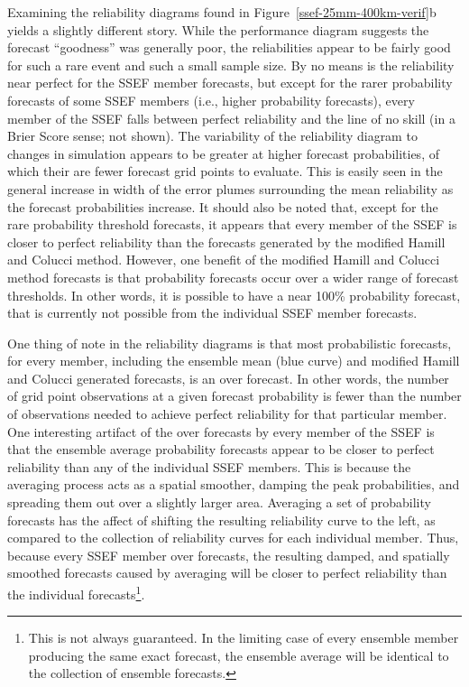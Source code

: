 Examining the reliability diagrams found in \mbox{Figure \ref{ssef-25mm-400km-verif}b} yields a slightly different story.
While the performance diagram suggests the forecast ``goodness'' was generally poor, the reliabilities appear to be fairly good for such a rare event and such a small sample size.
By no means is the reliability near perfect for the SSEF member forecasts, but except for the rarer probability forecasts of some SSEF members (i.e., higher probability forecasts), every member of the SSEF falls between perfect reliability and the line of no skill (in a Brier Score sense; not shown).
The variability of the reliability diagram to changes in simulation appears to be greater at higher forecast probabilities, of which their are fewer forecast grid points to evaluate.
This is easily seen in the general increase in width of the error plumes surrounding the mean reliability as the forecast probabilities increase.
It should also be noted that, except for the rare probability threshold forecasts, it appears that every member of the SSEF is closer to perfect reliability than the forecasts generated by the modified Hamill and Colucci method.
However, one benefit of the modified Hamill and Colucci method forecasts is that probability forecasts occur over a wider range of forecast thresholds.
In other words, it is possible to have a near 100\% probability forecast, that is currently not possible from the individual SSEF member forecasts.


One thing of note in the reliability diagrams is that most probabilistic forecasts, for every member, including the ensemble mean (blue curve) and modified Hamill and Colucci generated forecasts, is an over forecast.
In other words, the number of grid point observations at a given forecast probability is fewer than the number of observations needed to achieve perfect reliability for that particular member.
One interesting artifact of the over forecasts by every member of the SSEF is that the ensemble average probability forecasts appear to be closer to perfect reliability than any of the individual SSEF members.
This is because the averaging process acts as a spatial smoother, damping the peak probabilities, and spreading them out over a slightly larger area.
Averaging a set of probability forecasts has the affect of shifting the resulting reliability curve to the left, as compared to the collection of reliability curves for each individual member.
Thus, because every SSEF member over forecasts, the resulting damped, and spatially smoothed forecasts caused by averaging will be closer to perfect reliability than the individual forecasts\footnote{This is not always guaranteed. In the limiting case of every ensemble member producing the same exact forecast, the ensemble average will be identical to the collection of ensemble forecasts.}.




